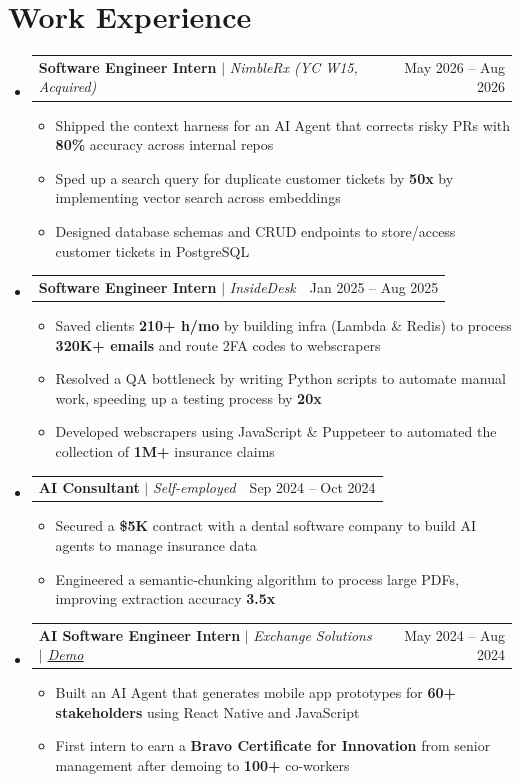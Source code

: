 \documentclass[letterpaper,11pt]{article}
\makeatletter
\newcommand{\resumeItem}[1]{
  \item\small{
    {#1 \vspace{-0.6pt}}
  }
}
\newcommand{\resumeSubheadingB}[3]{
  \vspace{0pt}\item
    \begin{tabular*}{0.97\textwidth}[t]{l@{\extracolsep{\fill}}r}
      \textbf{#1} $|$ \textit{#3} & #2 \\
    \end{tabular*}\vspace{-7pt}
}
\newcommand{\resumeSubHeadingListStart}{\begin{itemize}[leftmargin=0.15in, label={}]}
\newcommand{\resumeSubHeadingListEnd}{\end{itemize}}
\newcommand{\resumeItemListStart}{\begin{itemize}}
\newcommand{\resumeItemListEnd}{\end{itemize}\vspace{-7pt}}
\makeatother
\begin{document}
\section{Work Experience}
  \resumeSubHeadingListStart
    \resumeSubheadingB{Software Engineer Intern}{May 2026 -- Aug 2026}{NimbleRx (YC W15, Acquired)}
      \resumeItemListStart
        \resumeItem{Shipped the context harness for an AI Agent that corrects risky PRs with \textbf{80\%} accuracy across internal repos}
        \resumeItem{Sped up a search query for duplicate customer tickets by \textbf{50x} by implementing vector search across embeddings}
        \resumeItem{Designed database schemas and CRUD endpoints to store/access customer tickets in PostgreSQL}
      \resumeItemListEnd
    \resumeSubheadingB{Software Engineer Intern}{Jan 2025 -- Aug 2025}{InsideDesk}
      \resumeItemListStart
        \resumeItem{Saved clients \textbf{210+ h/mo} by building infra (Lambda \& Redis) to process \textbf{320K+ emails} and route 2FA codes to webscrapers}
        \resumeItem{Resolved a QA bottleneck by writing Python scripts to automate manual work, speeding up a testing process by \textbf{20x}}
        \resumeItem{Developed webscrapers using JavaScript \& Puppeteer to automated the collection of \textbf{1M+} insurance claims}
      \resumeItemListEnd
    \resumeSubheadingB{AI Consultant}{Sep 2024 -- Oct 2024}{Self-employed}
      \resumeItemListStart
        \resumeItem{Secured a \textbf{\$5K} contract with a dental software company to build AI agents to manage insurance data}
        \resumeItem{Engineered a semantic-chunking algorithm to process large PDFs, improving extraction accuracy \textbf{3.5x}}
      \resumeItemListEnd
    \resumeSubheadingB{AI Software Engineer Intern}{May 2024 -- Aug 2024}{Exchange Solutions $|$ \underline{\href{https://www.youtube.com/watch?v=mMaEmro4iEw}{Demo}}}
      \resumeItemListStart
        \resumeItem{Built an AI Agent that generates mobile app prototypes for \textbf{60+ stakeholders} using React Native and JavaScript}
        \resumeItem{First intern to earn a \textbf{Bravo Certificate for Innovation} from senior management after demoing to \textbf{100+} co-workers}
      \resumeItemListEnd\vspace{-10pt}
  \resumeSubHeadingListEnd
\end{document}
